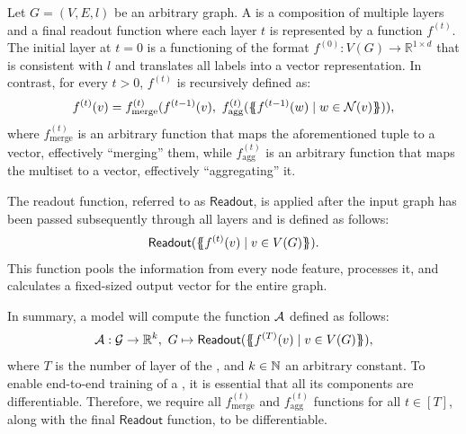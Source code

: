 \begin{definition}\label{def:gnn}
    Let $G = (V, E, l)$ be an arbitrary graph. A \gnn is a composition of multiple layers and a final readout function where each layer $t$ is represented by a function $f^{(t)}$. The initial layer at $t=0$ is a functioning of the format $f^{(0)}: V(G) \rightarrow \mathbb{R}^{1 \times d}$ that is consistent with $l$ and translates all labels into a vector representation. In contrast, for every $t > 0$, $f^{(t)}$ is recursively defined as:
    \begin{align*}
        f^{(t)}(v) = f^{(t)}_{\text{merge}} (f^{(t-1)}(v), \  f^{(t)}_{\text{agg}}( \{\!\!\{ f^{(t-1)}(w) \mid w \in \mathcal{N}(v) \}\!\!\} )),
    \end{align*}
    where $f^{(t)}_{\text{merge}}$ is an arbitrary function that maps the aforementioned tuple to a vector, effectively ``merging'' them, while $f^{(t)}_{\text{agg}}$ is an arbitrary function that maps the multiset to a vector, effectively ``aggregating'' it.
    
    The readout function, referred to as $\textsf{Readout}$, is applied after the input graph has been passed subsequently through all layers and is defined as follows:
    \begin{align*}
        \textsf{Readout}(\{\!\!\{ f^{(t)}(v) \mid v \in V(G) \}\!\!\}).
    \end{align*}
    This function pools the information from every node feature, processes it, and calculates a fixed-sized output vector for the entire graph.
    
    In summary, a \gnn model will compute the function $\mathcal{A}$ defined as follows:
    \begin{align*}
        \mathcal{A}: \mathcal{G} \rightarrow \mathbb{R}^k, \ G \mapsto \textsf{Readout}(\{\!\!\{ f^{(T)}(v) \mid v \in V(G) \}\!\!\}),
    \end{align*}
    where $T$ is the number of layer of the \gnn, and $k \in \mathbb{N}$ an arbitrary constant. To enable end-to-end training of a \gnn, it is essential that all its components are differentiable. Therefore, we require all $f^{(t)}_{\text{merge}}$ and $f^{(t)}_{\text{agg}}$ functions for all $t \in [T]$, along with the final $\textsf{Readout}$ function, to be differentiable.
\end{definition}
